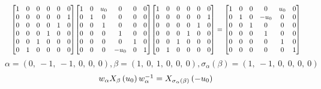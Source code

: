 \documentclass[11pt]{article}
\theoremstyle{definition}
\begin{document}
\[
\scaletoalign{\textwidth}{{\left[\begin{matrix}1 & 0 & 0 & 0 & 0 & 0\\0 & 0 & 0 & 0 & 0 & 1\\0 & 0 & 0 & 0 & 1 & 0\\0 & 0 & 0 & 1 & 0 & 0\\0 & 0 & 1 & 0 & 0 & 0\\0 & 1 & 0 & 0 & 0 & 0\end{matrix}\right]} {\left[\begin{matrix}1 & 0 & u_{0} & 0 & 0 & 0\\0 & 1 & 0 & 0 & 0 & 0\\0 & 0 & 1 & 0 & 0 & 0\\0 & 0 & 0 & 1 & 0 & 0\\0 & 0 & 0 & 0 & 1 & 0\\0 & 0 & 0 & - u_{0} & 0 & 1\end{matrix}\right]} {\left[\begin{matrix}1 & 0 & 0 & 0 & 0 & 0\\0 & 0 & 0 & 0 & 0 & 1\\0 & 0 & 0 & 0 & 1 & 0\\0 & 0 & 0 & 1 & 0 & 0\\0 & 0 & 1 & 0 & 0 & 0\\0 & 1 & 0 & 0 & 0 & 0\end{matrix}\right]} = {\left[\begin{matrix}1 & 0 & 0 & 0 & u_{0} & 0\\0 & 1 & 0 & - u_{0} & 0 & 0\\0 & 0 & 1 & 0 & 0 & 0\\0 & 0 & 0 & 1 & 0 & 0\\0 & 0 & 0 & 0 & 1 & 0\\0 & 0 & 0 & 0 & 0 & 1\end{matrix}\right]}}
\]
\[
\alpha = \left( 0, \  -1, \  -1, \  0, \  0, \  0\right), \beta = \left( 1, \  0, \  1, \  0, \  0, \  0\right), \sigma_{\alpha}(\beta) = \left( 1, \  -1, \  0, \  0, \  0, \  0\right)
\]
\[
\scaletoalign{\textwidth}{w_{\alpha} X_{\beta}\left(u_{0}\right) w_{\alpha}^{-1} = X_{\sigma_{\alpha}\left(\beta\right)}\left(- u_{0}\right)}
\]
\end{document}
